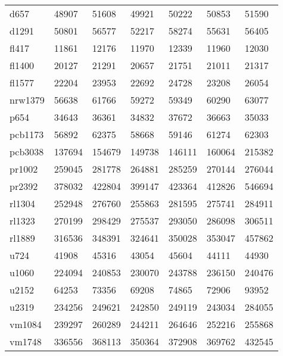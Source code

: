 \begin{center}
\begin{longtable}{lllllll}
			d657	 &	48907 & 51608    & 49921	& 50222	& 50853	& 51590 \\
			d1291 &	50801 & 56577    & 52217	& 58274	& 55631	& 56405 \\
			fl417 &	11861 & 12176    & 11970	& 12339	& 11960	& 12030 \\
			fl1400 &	20127 & 21291   & 20657	& 21751	& 21011	& 21317 \\
			fl1577 & 22204 & 23953   & 22692	& 24728	& 23208	& 26054 \\
			nrw1379 & 56638 & 61766  & 59272	& 59349	& 60290	& 63077 \\
			p654    & 34643 & 36361  & 34832	& 37672	& 36663	& 35033 \\
			pcb1173 & 56892 & 62375  & 58668	& 59146	& 61274	& 62303 \\
			pcb3038 & 137694 & 154679 & 149738 & 146111 & 160064 & 215382 \\
			pr1002	& 259045 & 281778 & 264881 & 285259 & 270144 & 276044 \\
			pr2392	& 378032 & 422804 & 399147 & 423364 & 412826 & 546694 \\
			rl1304	& 252948 & 276760 & 255863 & 281595 & 275741 & 284911 \\
			rl1323	& 270199 & 298429 & 275537 & 293050 & 286098 & 306511 \\
			rl1889	& 316536 & 348391 & 324641 & 350028 & 353047 & 457862 \\
			u724		& 41908 & 45316  & 43054  & 45604 & 44111 & 44930 \\
			u1060	& 224094 & 240853 & 230070 & 243788 & 236150 & 240476 \\
			u2152  	& 64253 & 73356	& 69208	& 74865 & 72906 & 93952 \\
			u2319 	& 234256 & 249621	 & 242850 & 249119 & 243034 & 284055 \\
			vm1084 	& 239297 & 260289	 & 244211 & 264646 & 252216 & 255868 \\
			vm1748	& 336556 & 368113	 & 350364 & 372908 & 369762 & 432545 \\

\end{longtable}
\end{center}